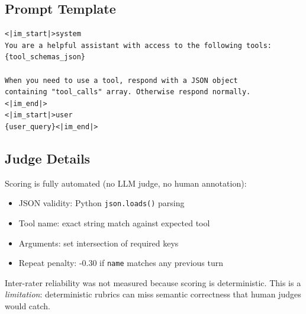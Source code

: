 \documentclass{article}
\begin{document}
\subsection{Prompt Template}

\begin{verbatim}
<|im_start|>system
You are a helpful assistant with access to the following tools:
{tool_schemas_json}

When you need to use a tool, respond with a JSON object
containing "tool_calls" array. Otherwise respond normally.
<|im_end|>
<|im_start|>user
{user_query}<|im_end|>
\end{verbatim}

\subsection{Judge Details}

Scoring is fully automated (no LLM judge, no human annotation):
\begin{itemize}
    \item JSON validity: Python \texttt{json.loads()} parsing
    \item Tool name: exact string match against expected tool
    \item Arguments: set intersection of required keys
    \item Repeat penalty: -0.30 if \texttt{name} matches any previous turn
\end{itemize}

Inter-rater reliability was not measured because scoring is deterministic. This is a \emph{limitation}: deterministic rubrics can miss semantic correctness that human judges would catch.



\end{document}
